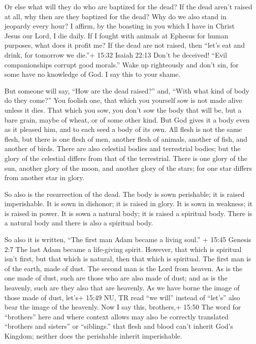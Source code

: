  Or else what will they do who are baptized for the dead?
If the dead aren't raised at all, why then are they baptized for the
dead?  Why do we also stand in jeopardy every hour?
 I affirm, by the boasting in you which I have in Christ
Jesus our Lord, I die daily.  If I fought with animals at
Ephesus for human purposes, what does it profit me? If the dead are not
raised, then ``let's eat and drink, for tomorrow we die.''+ 15:32 Isaiah
22:13  Don't be deceived! ``Evil companionships corrupt
good morals.''  Wake up righteously and don't sin, for some
have no knowledge of God. I say this to your shame.

 But someone will say, ``How are the dead raised?'' and,
``With what kind of body do they come?''  You foolish one,
that which you yourself sow is not made alive unless it dies.
 That which you sow, you don't sow the body that will be,
but a bare grain, maybe of wheat, or of some other kind. 
But God gives it a body even as it pleased him, and to each seed a body
of its own.  All flesh is not the same flesh, but there is
one flesh of men, another flesh of animals, another of fish, and another
of birds.  There are also celestial bodies and terrestrial
bodies; but the glory of the celestial differs from that of the
terrestrial.  There is one glory of the sun, another glory
of the moon, and another glory of the stars; for one star differs from
another star in glory.

 So also is the resurrection of the dead. The body is sown
perishable; it is raised imperishable.  It is sown in
dishonor; it is raised in glory. It is sown in weakness; it is raised in
power.  It is sown a natural body; it is raised a spiritual
body. There is a natural body and there is also a spiritual body.

 So also it is written, ``The first man Adam became a
living soul.'' + 15:45 Genesis 2:7 The last Adam became a life-giving
spirit.  However, that which is spiritual isn't first, but
that which is natural, then that which is spiritual.  The
first man is of the earth, made of dust. The second man is the Lord from
heaven.  As is the one made of dust, such are those who are
also made of dust; and as is the heavenly, such are they also that are
heavenly.  As we have borne the image of those made of
dust, let's+ 15:49 NU, TR read ``we will'' instead of ``let's'' also
bear the image of the heavenly.  Now I say this, brothers,+
15:50 The word for ``brothers'' here and where context allows may also
be correctly translated ``brothers and sisters'' or ``siblings.'' that
flesh and blood can't inherit God's Kingdom; neither does the perishable
inherit imperishable.


